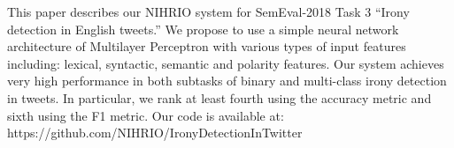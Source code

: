 This paper describes our NIHRIO system for SemEval-2018 Task 3 ``Irony detection in English tweets.'' We propose to use a simple neural network architecture of Multilayer Perceptron with various types of input features including: lexical, syntactic, semantic and polarity features. Our system achieves very high performance in both subtasks of binary and multi-class irony detection in tweets. In particular, we rank at least fourth using the accuracy metric and sixth using the F1 metric. Our code is available at: https://github.com/NIHRIO/IronyDetectionInTwitter
